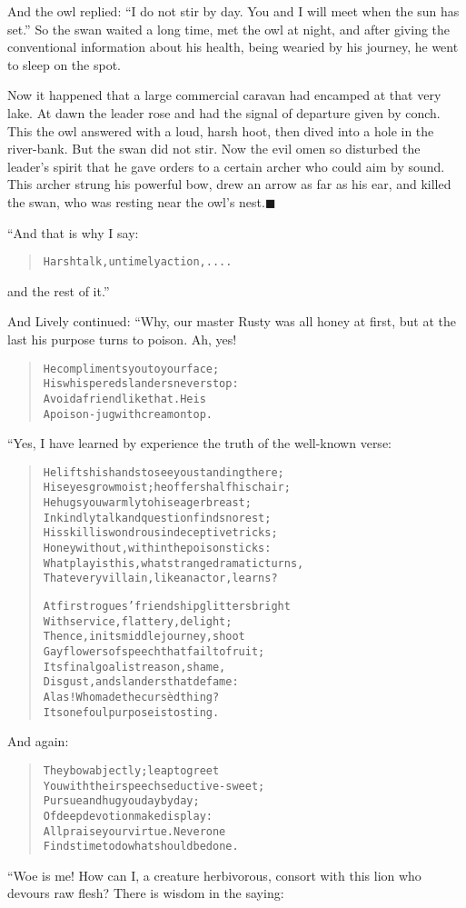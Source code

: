 \documentclass[article, twoside, 14pt]{memoir}
\newcommand{\qed}{\hfill \ensuremath{\blacksquare}}
\renewenvironment{verbatim}{%
\begin{quote}%
\vskip -10pt%
\begin{alltt}\normalfont\large}{\end{alltt}%
\end{quote}%
\vskip -10pt
} %
\begin{document}
And the owl replied:
``I do not stir by day. You and I will meet when the sun has set.''
So the swan waited a long time, met the owl at night, and after
giving the conventional information about his health, being wearied
by his journey, he went to sleep on the spot.

Now it happened that a large commercial caravan had encamped at
that very lake. At dawn the leader rose and had the signal of
departure given by conch. This the owl answered with a loud, harsh
hoot, then dived into a hole in the river-bank. But the swan did
not stir. Now the evil omen so disturbed the leader's spirit that
he gave orders to a certain archer who could aim by sound. This
archer strung his powerful bow, drew an arrow as far as his ear,
and killed the swan, who was resting near the owl's
nest.\hyperref[s15]{\qed}

“And that is why I say:

\begin{verbatim}
Harsh talk, untimely action,....
\end{verbatim}
and the rest of it.”

And Lively continued: “Why, our master Rusty was all honey at
first, but at the last his purpose turns to poison. Ah, yes!

\begin{verbatim}
He compliments you to your face;
    His whispered slanders never stop:
Avoid a friend like that. He is
    A poison-jug with cream on top.
\end{verbatim}
“Yes, I have learned by experience the truth of the
well-known verse:

\begin{verbatim}
He lifts his hands to see you standing there;
His eyes grow moist; he offers half his chair;
He hugs you warmly to his eager breast;
In kindly talk and question finds no rest;
His skill is wondrous in deceptive tricks;
Honey without, within the poison sticks:
What play is this, what strange dramatic turns,
That every villain, like an actor, learns?

At first rogues' friendship glitters bright
With service, flattery, delight;
Thence, in its middle journey, shoot
Gay flowers of speech that fail to fruit;
Its final goal is treason, shame,
Disgust, and slanders that defame:
Alas! Who made the cursèd thing?
Its one foul purpose is to sting.
\end{verbatim}
And again:

\begin{verbatim}
They bow abjectly; leap to greet
You with their speech seductive-sweet;
Pursue and hug you day by day;
Of deep devotion make display:
All praise your virtue. Never one
Finds time to do what should be done.
\end{verbatim}
“Woe is me! How can I, a creature herbivorous, consort with this
lion who devours raw flesh? There is wisdom in the saying:
\end{document}
